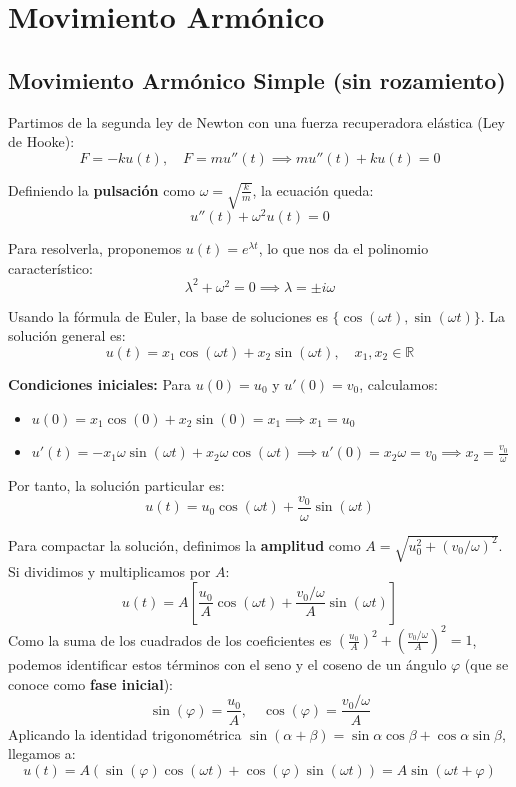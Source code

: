 ﻿\section{Movimiento Armónico}

\subsection{Movimiento Armónico Simple (sin rozamiento)}

Partimos de la segunda ley de Newton con una fuerza recuperadora elástica (Ley de Hooke):
\[
    F = -k u(t), \quad F = m u''(t) \implies m u''(t) + k u(t) = 0
\]

Definiendo la \textbf{pulsación} como $\omega = \sqrt{\frac{k}{m}}$, la ecuación queda:
\[
    u''(t) + \omega^2 u(t) = 0
\]

Para resolverla, proponemos $u(t) = e^{\lambda t}$, lo que nos da el polinomio característico:
\[
    \lambda^2 + \omega^2 = 0 \implies \lambda = \pm i \omega
\]

Usando la fórmula de Euler, la base de soluciones es $\{\cos(\omega t), \sin(\omega t)\}$. La solución general es:
\[
    u(t) = x_1 \cos(\omega t) + x_2 \sin(\omega t), \quad x_1, x_2 \in \mathbb{R}
\]

\textbf{Condiciones iniciales:} Para $u(0) = u_0$ y $u'(0) = v_0$, calculamos:
\begin{itemize}
    \item $u(0) = x_1 \cos(0) + x_2 \sin(0) = x_1 \implies x_1 = u_0$
    \item $u'(t) = -x_1 \omega \sin(\omega t) + x_2 \omega \cos(\omega t) \implies u'(0) = x_2 \omega = v_0 \implies x_2 = \frac{v_0}{\omega}$
\end{itemize}

Por tanto, la solución particular es:
\[
    u(t) = u_0 \cos(\omega t) + \frac{v_0}{\omega} \sin(\omega t)
\]

Para compactar la solución, definimos la \textbf{amplitud} como $A = \sqrt{u_0^2 + (v_0/\omega)^2}$. Si dividimos y multiplicamos por $A$:
\[
    u(t) = A \left[ \frac{u_0}{A} \cos(\omega t) + \frac{v_0/\omega}{A} \sin(\omega t) \right]
\]
Como la suma de los cuadrados de los coeficientes es $\left(\frac{u_0}{A}\right)^2 + \left(\frac{v_0/\omega}{A}\right)^2 = 1$, podemos identificar estos términos con el seno y el coseno de un ángulo $\varphi$ (que se conoce como \textbf{fase inicial}):
\[
    \sin(\varphi) = \frac{u_0}{A}, \quad \cos(\varphi) = \frac{v_0/\omega}{A}
\]
Aplicando la identidad trigonométrica $\sin(\alpha + \beta) = \sin\alpha\cos\beta + \cos\alpha\sin\beta$, llegamos a:
\[
    u(t) = A (\sin(\varphi)\cos(\omega t) + \cos(\varphi)\sin(\omega t)) = A \sin(\omega t + \varphi)
\]

